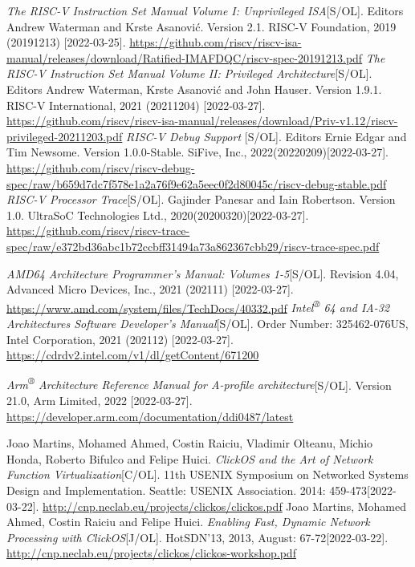 \documentclass[UTF8,fontset=none,linespread=1.15]{ctexart}
\begin{document}
\begin{thebibliography}{99}
 \textit{The RISC-V Instruction Set Manual
Volume I: Unprivileged ISA}[S/OL]. Editors Andrew Waterman and Krste Asanović. Version 2.1. RISC-V Foundation, 2019 (20191213) [2022-03-25]. \url{https://github.com/riscv/riscv-isa-manual/releases/download/Ratified-IMAFDQC/riscv-spec-20191213.pdf}
 \textit{The RISC-V Instruction Set Manual
Volume II: Privileged Architecture}[S/OL]. Editors Andrew Waterman, Krste Asanović and John Hauser.
Version 1.9.1. RISC-V International, 2021 (20211204) [2022-03-27]. \url{https://github.com/riscv/riscv-isa-manual/releases/download/Priv-v1.12/riscv-privileged-20211203.pdf}
 \textit{RISC-V Debug Support
}[S/OL]. Editors Ernie Edgar and Tim Newsome. Version 1.0.0-Stable. SiFive, Inc., 2022(20220209)[2022-03-27]. \url{https://github.com/riscv/riscv-debug-spec/raw/b659d7dc7f578e1a2a76f9e62a5eec0f2d80045c/riscv-debug-stable.pdf}
 \textit{RISC-V Processor Trace}[S/OL]. Gajinder Panesar and
Iain Robertson. Version 1.0. UltraSoC Technologies Ltd., 2020(20200320)[2022-03-27]. \url{https://github.com/riscv/riscv-trace-spec/raw/e372bd36abc1b72ccbff31494a73a862367cbb29/riscv-trace-spec.pdf}

 \textit{AMD64 Architecture Programmer's Manual: Volumes 1-5}[S/OL]. Revision 4.04, Advanced Micro Devices, Inc., 2021 (202111) [2022-03-27]. \url{https://www.amd.com/system/files/TechDocs/40332.pdf}
 \textit{Intel\textsuperscript{®} 64 and IA-32 Architectures Software Developer’s Manual}[S/OL]. Order Number: 325462-076US, Intel Corporation, 2021 (202112) [2022-03-27]. \url{https://cdrdv2.intel.com/v1/dl/getContent/671200}

 \textit{Arm\textsuperscript{®} Architecture Reference Manual
for A-profile architecture}[S/OL]. Version 21.0, Arm Limited, 2022 [2022-03-27]. \url{https://developer.arm.com/documentation/ddi0487/latest}

 Joao Martins, Mohamed Ahmed, Costin Raiciu, Vladimir Olteanu,
Michio Honda, Roberto Bifulco and Felipe Huici. \textit{ClickOS and the Art of Network Function Virtualization}[C/OL]. 11th USENIX Symposium on Networked Systems
Design and Implementation. Seattle: USENIX Association. 2014: 459-473[2022-03-22]. \url{http://cnp.neclab.eu/projects/clickos/clickos.pdf}
 Joao Martins, Mohamed Ahmed, Costin Raiciu and Felipe Huici.
\textit{Enabling Fast, Dynamic Network Processing with ClickOS}[J/OL]. HotSDN'13, 2013, August: 67-72[2022-03-22]. \url{http://cnp.neclab.eu/projects/clickos/clickos-workshop.pdf}


\end{thebibliography}
\end{document}
